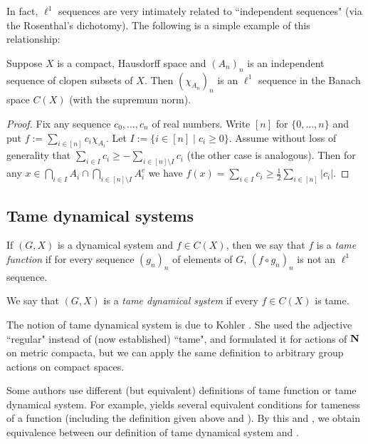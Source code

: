 	In fact, $\ell^1$ sequences are very intimately related to ``independent sequences" (via the Rosenthal's dichotomy).
	The following is a simple example of this relationship:
	
	\begin{fct}
		\label{fct:ind_untame}
		Suppose $X$ is a compact, Hausdorff space and $(A_n)_n$ is an independent sequence of clopen subsets of $X$. Then $(\chi_{A_n})_n$ is an $\ell^1$ sequence in the Banach space $C(X)$ (with the supremum norm).
	\end{fct}
	\begin{proof}
		Fix any sequence $c_0,\ldots,c_n$ of real numbers. Write $[n]$ for $\{0,\ldots,n\}$ and put $f:=\sum_{i\in [n]} c_i\chi_{A_i}$. Let $I:=\{i\in [n]\mid c_i\geq 0 \}$. Assume without loss of generality that $\sum_{i\in I} c_i\geq -\sum_{i\in [n]\setminus I} c_i$ (the other case is analogous). Then for any $x\in \bigcap_{i\in I} A_i\cap \bigcap_{i\in [n]\setminus I} A_i^c$ we have $f(x)=\sum_{i\in I} c_i\geq \frac{1}{2} \sum_{i\in [n]} \lvert c_i\rvert$.
	\end{proof}
	
	
	
	
	
	
	
	
	
	
	\subsection*{Tame dynamical systems}\label{section: tame systems}
	
	
	\begin{dfn}
		\label{dfn:tame_function_system}
		If $(G,X)$ is a dynamical system and $f\in C(X)$, then we say that $f$ is a \emph{tame function} if for every sequence $(g_n)_n$ of elements of $G$, $(f\circ g_n)_n$ is not an $\ell^1$ sequence.
		
		We say that $(G,X)$ is a \emph{tame dynamical system} if every $f\in C(X)$ is tame.
		\xqed{\lozenge}
	\end{dfn}
	
	\begin{rem}
		\label{rem:dfn_equiv}
		The notion of tame dynamical system is due to Kohler \cite{Koh95}. She used the adjective ``regular" instead of (now established) ``tame", and formulated it for actions of ${\mathbf{N}}$ on metric compacta, but we can apply the same definition to arbitrary group actions on compact spaces.
		
		Some authors use different (but equivalent) definitions of tame function or tame dynamical system. For example, \cite[Fact 4.3 and Proposition 5.6]{GM12} yields several equivalent conditions for tameness of a function (including the definition given above and \cite[Definition 5.5]{GM12}). By this and \cite[Corollary 5.8]{GM12}, we obtain equivalence between our definition of tame dynamical system and \cite[Definition 5.2]{GM12}.\xqed{\lozenge}
	\end{rem}
	
